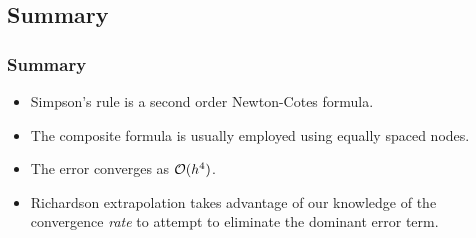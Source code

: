 \documentclass{beamer}
\begin{document}
\subsection{Summary}

\begin{frame}
  \frametitle{Summary}

  \begin{itemize}
  \item Simpson's rule is a second order Newton-Cotes formula.
  \item The composite formula is usually employed using equally spaced
    nodes.
  \item The error converges as ${\cal O}(h^4)$.
  \item Richardson extrapolation takes advantage of our knowledge of
    the convergence \emph{rate} to attempt to eliminate the dominant
    error term.
  \end{itemize}

\end{frame}
\end{document}
